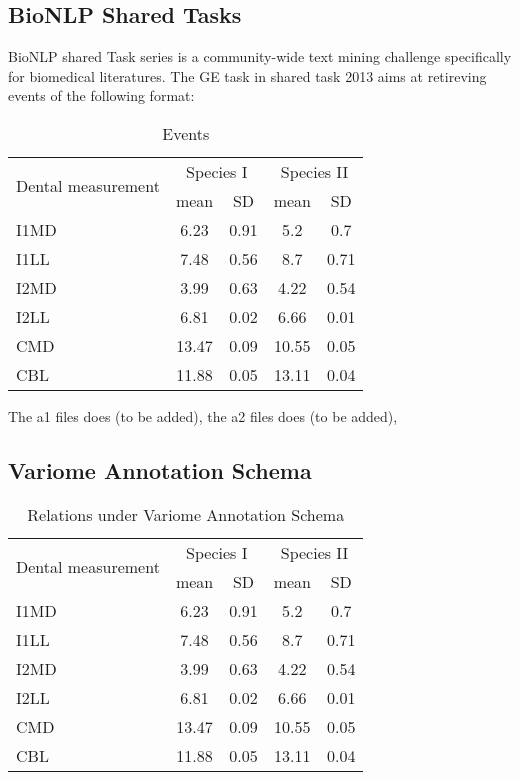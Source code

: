 \subsection{BioNLP Shared Tasks}
BioNLP shared Task series is a community-wide text mining challenge specifically for biomedical literatures. The GE task in shared task 2013 aims at retireving events of the following format:
\begin{table}
	\caption{Events}
	\centering
	\label{table:events}
	\begin{tabular}{l c c c c}
		\hline 
		\multirow{2}{*}{Dental measurement} & \multicolumn{2}{c}{Species I} & \multicolumn{2}{c}{Species II} \\ 
		\cline{2-5}
		& mean & SD  & mean & SD  \\ 
		\hline
		I1MD & 6.23 & 0.91 & 5.2  & 0.7  \\
		
		I1LL & 7.48 & 0.56 & 8.7  & 0.71 \\
		
		I2MD & 3.99 & 0.63 & 4.22 & 0.54 \\
		
		I2LL & 6.81 & 0.02 & 6.66 & 0.01 \\
		
		CMD & 13.47 & 0.09 & 10.55 & 0.05 \\
		
		CBL & 11.88 & 0.05 & 13.11 & 0.04\\ 
		\hline 
	\end{tabular}
\end{table}

The a1 files does (to be added), the a2 files does (to be added), 

\subsection{Variome Annotation Schema}
\begin{table}
	\caption{Relations under Variome Annotation Schema}
	\centering
	\label{table:relations}
	\begin{tabular}{l c c c c}
		\hline 
		\multirow{2}{*}{Dental measurement} & \multicolumn{2}{c}{Species I} & \multicolumn{2}{c}{Species II} \\ 
		\cline{2-5}
		& mean & SD  & mean & SD  \\ 
		\hline
		I1MD & 6.23 & 0.91 & 5.2  & 0.7  \\
		
		I1LL & 7.48 & 0.56 & 8.7  & 0.71 \\
		
		I2MD & 3.99 & 0.63 & 4.22 & 0.54 \\
		
		I2LL & 6.81 & 0.02 & 6.66 & 0.01 \\
		
		CMD & 13.47 & 0.09 & 10.55 & 0.05 \\
		
		CBL & 11.88 & 0.05 & 13.11 & 0.04\\ 
		\hline 
	\end{tabular}
\end{table}

